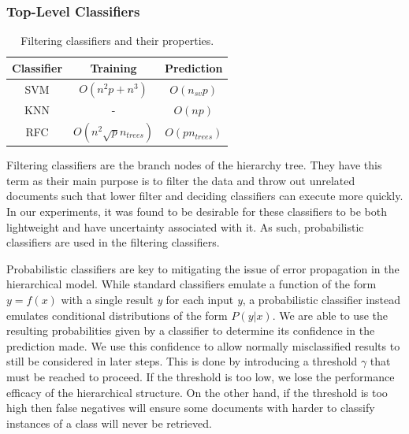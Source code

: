\subsubsection{Top-Level Classifiers}

\begin{table}[h]
    \begin{tabular}{c|cc}
        Classifier & Training & Prediction \\ \hline
        SVM & $O(n^2p+n^3)$ & $O(n_{sv}p)$ \\
        KNN & - & $O(np)$ \\
        RFC & $O(n^2\sqrt{p}n_{trees})$ & $O(pn_{trees})$
    \end{tabular}
\caption{Filtering classifiers and their properties.}
\label{tab:filt-class}
\end{table}

Filtering classifiers are the branch nodes of the hierarchy tree. They have this term as their main purpose is to filter the data and throw out unrelated documents such that lower filter and deciding classifiers can execute more quickly. In our experiments, it was found to be desirable for these classifiers to be both lightweight and have uncertainty associated with it. As such, probabilistic classifiers are used in the filtering classifiers. 

Probabilistic classifiers are key to mitigating the issue of error propagation in the hierarchical model. While standard classifiers emulate a function of the form $y=f(x)$ with a single result \textit{y} for each input \textit{y}, a probabilistic classifier instead emulates conditional distributions of the form $P(y|x)$. We are able to use the resulting probabilities given by a classifier to determine its confidence in the prediction made. We use this confidence to allow normally misclassified results to still be considered in later steps. This is done by introducing a threshold $\gamma$ that must be reached to proceed. If the threshold is too low, we lose the performance efficacy of the hierarchical structure. On the other hand, if the threshold is too high then false negatives will ensure some documents with harder to classify instances of a class will never be retrieved.

